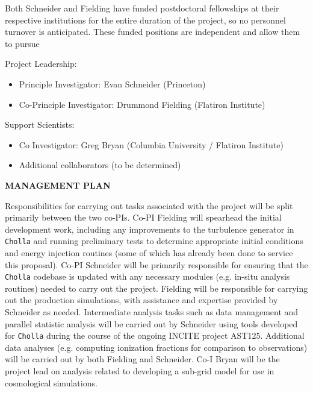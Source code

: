 \documentclass[11pt,letterpaper,english]{article}
\begin{document}
\begin{flushleft}
Both Schneider and Fielding have funded postdoctoral fellowships at their respective institutions for the entire duration of the project, so no personnel turnover is anticipated.  These funded positions are independent and allow them to pursue 

Project Leadership:
\vspace{-.15in}
\begin{itemize}
\item Principle Investigator: Evan Schneider (Princeton) \\ 
\item Co-Principle Investigator: Drummond Fielding (Flatiron Institute) \\
\end{itemize} 

Support Scientists:
\vspace{-.15in}
\begin{itemize}
\item Co Investigator: Greg Bryan (Columbia University / Flatiron Institute) \\ 
\item Additional collaborators (to be determined)
\end{itemize} 

{\noindent \bf  {MANAGEMENT PLAN}}

Responsibilities for carrying out tasks associated with the project will be split primarily between the two co-PIs. Co-PI Fielding will spearhead the initial development work, including any improvements to the turbulence generator in {\tt Cholla} and running preliminary tests to determine appropriate initial conditions and energy injection routines (some of which has already been done to service this proposal). Co-PI Schneider will be primarily responsible for ensuring that the {\tt Cholla} codebase is updated with any necessary modules (e.g. in-situ analysis routines) needed to carry out the project. Fielding will be responsible for carrying out the production simulations, with assistance and expertise provided by Schneider as needed. Intermediate analysis tasks such as data management and parallel statistic analysis will be carried out by Schneider using tools developed for {\tt Cholla} during the course of the ongoing INCITE project AST125. Additional data analyses (e.g. computing ionization fractions for comparison to observations) will be carried out by both Fielding and Schneider. Co-I Bryan will be the project lead on analysis related to developing a sub-grid model for use in cosmological simulations.


\end{flushleft}
\end{document}
